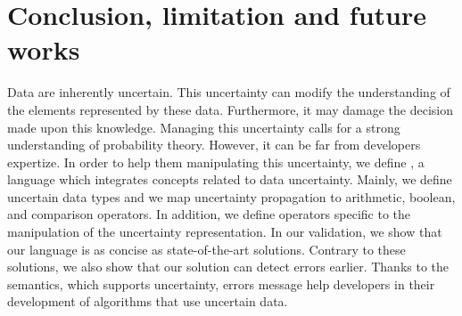 \section{Conclusion, limitation and future works}
\label{sec:conclusion}

Data are inherently uncertain.
This uncertainty can modify the understanding of the elements represented by these data.
Furthermore, it may damage the decision made upon this knowledge.
Managing this uncertainty calls for a strong understanding of probability theory.
However, it can be far from developers expertize.
In order to help them manipulating this uncertainty, we define \languageName{}, a language which integrates concepts related to data uncertainty.
Mainly, we define uncertain data types and we map uncertainty propagation to arithmetic, boolean, and comparison operators.
In addition, we define operators specific to the manipulation of the uncertainty representation.
In our validation, we show that our language is as concise as state-of-the-art solutions.
Contrary to these solutions, we also show that our solution can detect errors earlier.
Thanks to the semantics, which supports uncertainty, errors message help developers in their development of algorithms that use uncertain data.


